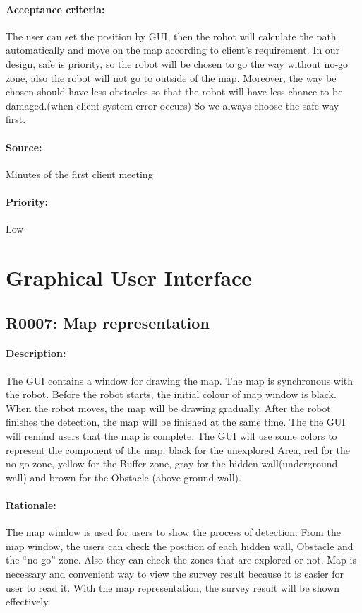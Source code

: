 \documentclass[11pt, a4paper]{report}
\begin{document}
\paragraph{Acceptance criteria:}
The user can set the position by GUI, then the robot will calculate the path automatically and move on the map according to client's requirement. In our design, safe is priority, so the robot will be chosen to go the way without no-go zone, also the robot will not go to outside of the map. Moreover, the way be chosen should have less obstacles so that the robot will have less chance to be damaged.(when client system error occurs)  So we always choose the safe way first.    
\paragraph{Source:}
 Minutes of the first client meeting   
\paragraph{Priority:}
Low


\section{Graphical User Interface}
\subsection{R0007: Map representation}
\paragraph{Description:}
The GUI contains a window for drawing the map. The map is synchronous with the robot. Before the  robot starts, the initial colour of map window is black. When the robot moves, the map will be drawing gradually. After the robot finishes the detection, the map will be finished at the same time. The the GUI will remind users that the map is complete. The GUI will use some colors to represent the component of the map: black for the unexplored Area, red for the no-go zone, yellow for the Buffer zone, gray for the hidden wall(underground wall) and brown for the Obstacle (above-ground wall).
\paragraph{Rationale:}
The map window is used for users to show the process of detection. From the map window, the users can check the position of each hidden wall, Obstacle and the “no go” zone. Also they can check the zones that are explored or not. Map is necessary and convenient way to view the survey result because it is easier for user to read it. With the map representation, the survey result will be shown effectively.
\end{document}

